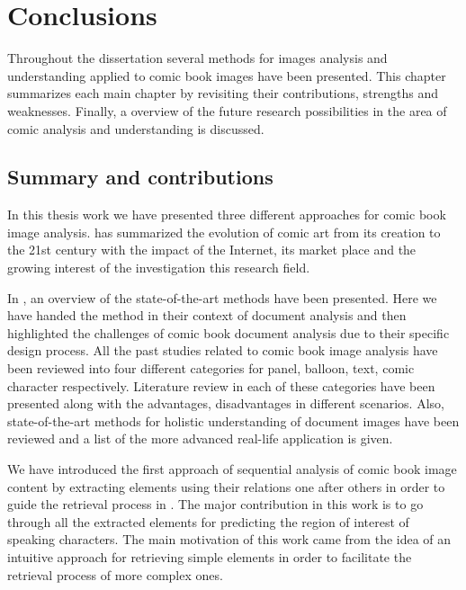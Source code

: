 \chapter{Conclusions} %
\label{chap:conclusions}

Throughout the dissertation several methods for images analysis and understanding applied to comic book images have been presented.
This chapter summarizes each main chapter by revisiting their contributions, strengths and weaknesses.
Finally, a overview of the future research possibilities in the area of comic analysis and understanding is discussed.

\section{Summary and contributions}
\label{conclusions:summary}



In this thesis work we have presented three different approaches for comic book image analysis.  has summarized the evolution of comic art from its creation to the 21st century with the impact of the Internet, its market place and the growing interest of the investigation this research field.

In , an overview of the state-of-the-art methods have been presented. Here we have handed the method in their context of document analysis and then highlighted the challenges of comic book document analysis due to their specific design process.
All the past studies related to comic book image analysis have been reviewed into four different categories for panel, balloon, text, comic character respectively.
Literature review in each of these categories have been presented along with the advantages, disadvantages in different scenarios.
Also, state-of-the-art methods for holistic understanding of document images have been reviewed and a list of the more advanced real-life application is given.

We have introduced the first approach of sequential analysis of comic book image content by extracting elements using their relations one after others in order to guide the retrieval process in .
The major contribution in this work is to go through all the extracted elements for predicting the region of interest of speaking characters.
The main motivation of this work came from the idea of an intuitive approach for retrieving simple elements in order to facilitate the retrieval process of more complex ones.

